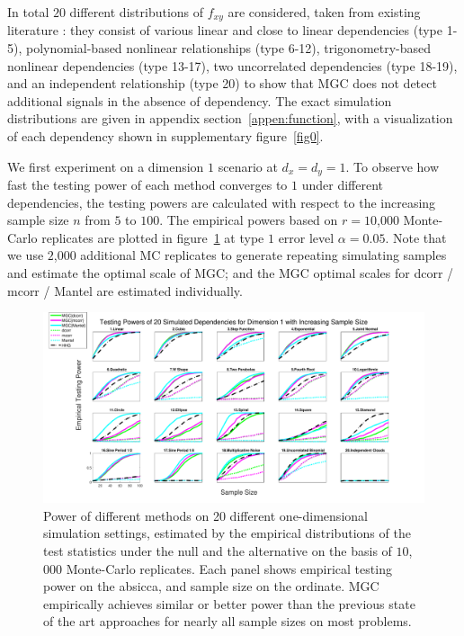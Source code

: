\documentclass[11pt]{article}
\begin{document}
In total $20$ different distributions of $f_{xy}$ are considered, taken from existing literature \cite{SzekelyRizzoBakirov2007, SimonTibshirani2012, GorfineHellerHeller2012, HellerGorfine2013}: they consist of various linear and close to linear dependencies (type 1-5), polynomial-based nonlinear relationships (type 6-12), trigonometry-based nonlinear dependencies (type 13-17), two uncorrelated dependencies (type 18-19), and an independent relationship (type 20) to show that MGC does not detect additional signals in the absence of dependency. The exact simulation distributions are given in appendix section~\ref{appen:function}, with a visualization of each dependency shown in supplementary figure~\ref{fig0}.

We first experiment on a dimension $1$ scenario at $d_{x}=d_{y}=1$. To observe how fast the testing power of each method converges to $1$ under different dependencies, the testing powers are calculated with respect to the increasing sample size $n$ from $5$ to $100$. The empirical powers based on $r=10$,$000$ Monte-Carlo replicates are plotted in figure~\ref{fig:1D} at type $1$ error level $\alpha=0.05$. Note that we use $2$,$000$ additional MC replicates to generate repeating simulating samples and estimate the optimal scale of MGC; and the MGC optimal scales for dcorr / mcorr / Mantel are estimated individually.

\begin{figure}[htbp]
\includegraphics[width=1.0\textwidth]{../Figures/Fig1}
\caption{
Power of different methods on 20 different one-dimensional simulation settings, estimated by the empirical distributions of the test statistics under the null and the alternative on the basis of $10$,$000$ Monte-Carlo replicates.
Each panel shows empirical testing power on the absicca, and sample size on the ordinate.
MGC empirically achieves similar or better power than the previous state of the art approaches for nearly all sample sizes on most problems.}
\label{fig:1D}
\end{figure}
\end{document}
